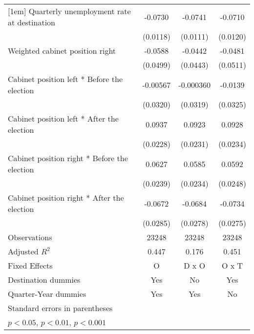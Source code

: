 \begin{table}[htbp]
\begin{tabular}{l*{3}{c}}
[1em]
Quarterly unemployment rate at destination&     -0.0730\sym{***}&     -0.0741\sym{***}&     -0.0710\sym{***}\\
                    &    (0.0118)         &    (0.0111)         &    (0.0120)         \\
[1em]
Weighted cabinet position right&     -0.0588         &     -0.0442         &     -0.0481         \\
                    &    (0.0499)         &    (0.0443)         &    (0.0511)         \\
[1em]
Cabinet position left * Before the election&    -0.00567         &   -0.000360         &     -0.0139         \\
                    &    (0.0320)         &    (0.0319)         &    (0.0325)         \\
[1em]
Cabinet position left * After the election&      0.0937\sym{***}&      0.0923\sym{***}&      0.0928\sym{***}\\
                    &    (0.0228)         &    (0.0231)         &    (0.0234)         \\
[1em]
Cabinet position right * Before the election&      0.0627\sym{*}  &      0.0585\sym{*}  &      0.0592\sym{*}  \\
                    &    (0.0239)         &    (0.0234)         &    (0.0248)         \\
[1em]
Cabinet position right * After the election&     -0.0672\sym{*}  &     -0.0684\sym{*}  &     -0.0734\sym{*}  \\
                    &    (0.0285)         &    (0.0278)         &    (0.0275)         \\
\hline
Observations        &       23248         &       23248         &       23248         \\
Adjusted \(R^{2}\)  &       0.447         &       0.176         &       0.451         \\
Fixed Effects       &           O         &       D x O         &       O x T         \\
Destination dummies &         Yes         &          No         &         Yes         \\
Quarter-Year dummies&         Yes         &         Yes         &          No         \\
\hline\hline
\multicolumn{4}{l}{\footnotesize Standard errors in parentheses}\\
\multicolumn{4}{l}{\footnotesize \sym{*} \(p<0.05\), \sym{**} \(p<0.01\), \sym{***} \(p<0.001\)}\\
\end{tabular}
\end{table}
